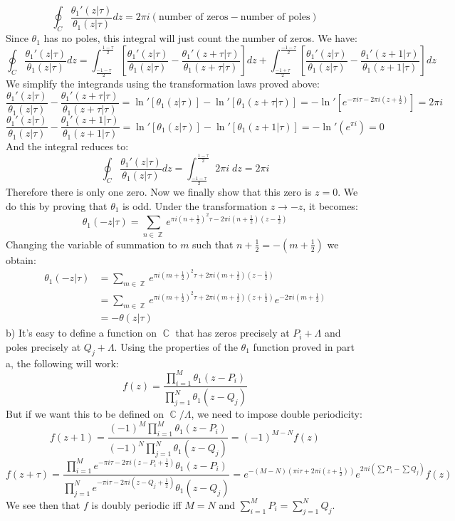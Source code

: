 \documentclass[12 pt]{article}
\DeclareMathOperator {\C} {\mathbb{C}}
\DeclareMathOperator {\Z} {\mathbb{Z}}
\theoremstyle{plain}
\theoremstyle{definition}
\theoremstyle{remark}
\begin{document}
\[          \oint_C \frac{\theta_1'(z| \tau)}{\theta_1(z|\tau)} dz = 2\pi i ( \text{number of zeros} - \text{number of poles}  )       \]
Since $\theta_1$ has no poles, this integral will just count the number of zeros. We have:
\[       \oint_C \frac{\theta_1'(z| \tau)}{\theta_1(z|\tau)} dz = \int_{\frac{-1-\tau}{2}}^{\frac{1-\tau}{2}} \left[ \frac{\theta_1'(z| \tau)}{\theta_1(z|\tau)} - \frac{\theta_1'(z+ \tau| \tau)}{\theta_1(z+ \tau|\tau)} \right] dz  + \int_{\frac{-1+\tau}{2}}^{\frac{-1-\tau}{2}} \left[ \frac{\theta_1'(z| \tau)}{\theta_1(z|\tau)} - \frac{\theta_1'(z+ 1| \tau)}{\theta_1(z+ 1|\tau)} \right] dz   \]
We simplify the integrands using the transformation laws proved above:
\[         \frac{\theta_1'(z| \tau)}{\theta_1(z|\tau)} - \frac{\theta_1'(z+ \tau| \tau)}{\theta_1(z+ \tau|\tau)}   = \ln' [\theta_1(z|\tau)] - \ln'[\theta_1(z+ \tau|\tau)]   = -  \ln'[e^{-\pi i \tau - 2\pi i (z+\frac{1}{2})}]  = 2\pi i \]
\[       \frac{\theta_1'(z| \tau)}{\theta_1(z|\tau)} - \frac{\theta_1'(z+ 1| \tau)}{\theta_1(z+ 1|\tau)}   = \ln' [\theta_1(z|\tau)] - \ln'[\theta_1(z+ 1|\tau)]        = - \ln'(e^{\pi i}) = 0 \]
And the integral reduces to:
\[      \oint_C \frac{\theta_1'(z| \tau)}{\theta_1(z|\tau)} dz =   \int_{\frac{-1-\tau}{2}}^{\frac{1-\tau}{2}} 2\pi i \; dz = 2\pi i   \]
Therefore there is only one zero. Now we finally show that this zero is $z=0$. We do this by proving that $\theta_1$ is odd. Under the transformation $z\to -z$, it becomes:
\[      \theta_1 (-z | \tau) =   \sum_{n\in \Z}  e^{\pi i (n+ \frac{1}{2})^2 \tau - 2\pi i (n+\frac{1}{2}) (z - \frac{1}{2})}   \]
Changing the variable of summation to $m$ such that $n+\frac{1}{2} = - \left( m + \frac{1}{2} \right)$ we obtain:
\begin{align*}          \theta_1 (-z | \tau) &=   \sum_{m\in \Z}  e^{\pi i (m+ \frac{1}{2})^2 \tau + 2\pi i (m+\frac{1}{2}) (z - \frac{1}{2})}     \\
 &=  \sum_{m\in \Z}  e^{\pi i (m+ \frac{1}{2})^2 \tau + 2\pi i (m+\frac{1}{2}) (z + \frac{1}{2})} e^{-2\pi i (m+\frac{1}{2})} \\
 &=  - \theta(z | \tau)
\end{align*}
b) It's easy to define a function on $\C$ that has zeros precisely at $P_i + \Lambda$ and poles precisely at $Q_j + \Lambda$. Using the properties of the $\theta_1$ function proved in part a, the following will work:
\[      f(z) = \frac{\prod_{i=1}^M \theta_1(z-P_i)}{\prod_{j=1}^N \theta_1(z-Q_j)}       \]
But if we want this to be defined on $\C/\Lambda$, we need to impose double periodicity:
\[      f(z+1) = \frac{(-1)^M \prod_{i=1}^M \theta_1(z-P_i)}{(-1)^N \prod_{j=1}^N \theta_1(z-Q_j)}   = (-1)^{M-N} f(z)       \]
\[      f(z+ \tau) =     \frac{\prod_{i=1}^M e^{-\pi i \tau - 2\pi i (z - P_i +\frac{1}{2})} \theta_1(z-P_i)}{\prod_{j=1}^N e^{-\pi i \tau - 2\pi i (z - Q_j +\frac{1}{2})} \theta_1(z-Q_j)}   = e^{- (M - N) (\pi i \tau + 2\pi i (z+\frac{1}{2}))}  e^{2\pi i (\sum P_i - \sum Q_j)} f(z)   \]
We see then that $f$ is doubly periodic iff $M = N$ and $\sum_{i=1}^M P_i = \sum_{j=1}^N Q_j$.
\end{document}
